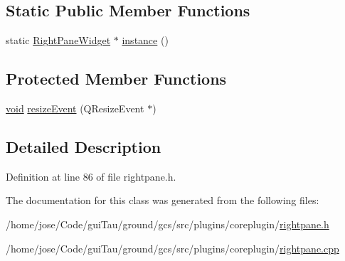 \subsection*{Static Public Member Functions}
\begin{DoxyCompactItemize}
\item 
static \hyperlink{class_core_1_1_right_pane_widget}{Right\-Pane\-Widget} $\ast$ \hyperlink{group___core_plugin_ga991b0b23f40c778845a96586009d5290}{instance} ()
\end{DoxyCompactItemize}
\subsection*{Protected Member Functions}
\begin{DoxyCompactItemize}
\item 
\hyperlink{group___u_a_v_objects_plugin_ga444cf2ff3f0ecbe028adce838d373f5c}{void} \hyperlink{group___core_plugin_ga5e424134c6bc790d1496f8bad768a6ef}{resize\-Event} (Q\-Resize\-Event $\ast$)
\end{DoxyCompactItemize}


\subsection{Detailed Description}


Definition at line 86 of file rightpane.\-h.



The documentation for this class was generated from the following files\-:\begin{DoxyCompactItemize}
\item 
/home/jose/\-Code/gui\-Tau/ground/gcs/src/plugins/coreplugin/\hyperlink{rightpane_8h}{rightpane.\-h}\item 
/home/jose/\-Code/gui\-Tau/ground/gcs/src/plugins/coreplugin/\hyperlink{rightpane_8cpp}{rightpane.\-cpp}\end{DoxyCompactItemize}
